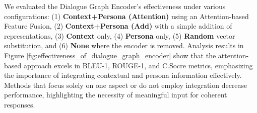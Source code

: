 \documentclass[letterpaper]{article} %
\begin{document}


We evaluated the Dialogue Graph Encoder's effectiveness under various configurations: (1) \textbf{Context+Persona (Attention)} using an Attention-based Feature Fusion, (2) \textbf{Context+Persona (Add)} with a simple addition of representations, (3) \textbf{Context} only, (4) \textbf{Persona} only, (5) \textbf{Random} vector substitution, and (6) \textbf{None} where the encoder is removed. Analysis results in Figure \ref{fig:effectiveness_of_dialogue_graph_encoder} show that the attention-based approach excels in BLEU-1, ROUGE-1, and C.Socre metrics, emphasizing the importance of integrating contextual and persona information effectively. Methods that focus solely on one aspect or do not employ integration decrease performance, highlighting the necessity of meaningful input for coherent responses.
\end{document}
